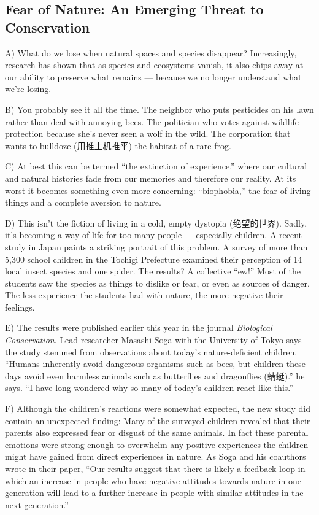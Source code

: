 \documentclass[UTF8,11pt]{ctexart}
\begin{document}
\subsection*{\textbf{Fear of Nature: An Emerging Threat to Conservation}}


A) What do we lose when natural spaces and species disappear? Increasingly, research has shown that as species and ecosystems vanish, it also chips away at our ability to preserve what remains — because we no longer understand what we’re losing.


B) You probably see it all the time. The neighbor who puts pesticides on his lawn rather than deal with annoying bees. The politician who votes against wildlife protection because she’s never seen a wolf in the wild. The corporation that wants to bulldoze (用推土机推平) the habitat of a rare frog.


C) At best this can be termed “the extinction of experience.” where our cultural and natural histories fade from our memories and therefore our reality. At its worst it becomes something even more concerning: “biophobia,” the fear of living things and a complete aversion to nature.


D) This isn’t the fiction of living in a cold, empty dystopia (绝望的世界). Sadly, it’s becoming a way of life for too many people — especially children. A recent study in Japan paints a striking portrait of this problem. A survey of more than 5,300 school children in the Tochigi Prefecture examined their perception of 14 local insect species and one spider. The results? A collective “ew!” Most of the students saw the species as things to dislike or fear, or even as sources of danger. The less experience the students had with nature, the more negative their feelings.


E) The results were published earlier this year in the journal \textit{Biological Conservation}. Lead researcher Masashi Soga with the University of Tokyo says the study stemmed from observations about today’s nature-deficient children. “Humans inherently avoid dangerous organisms such as bees, but children these days avoid even harmless animals such as butterflies and dragonflies (蜻蜓).” he says. “I have long wondered why so many of today’s children react like this.”


F) Although the children’s reactions were somewhat expected, the new study did contain an unexpected finding: Many of the surveyed children revealed that their parents also expressed fear or disgust of the same animals. In fact these parental emotions were strong enough to overwhelm any positive experiences the children might have gained from direct experiences in nature. As Soga and his coauthors wrote in their paper, “Our results suggest that there is likely a feedback loop in which an increase in people who have negative attitudes towards nature in one generation will lead to a further increase in people with similar attitudes in the next generation.”
\end{document}
